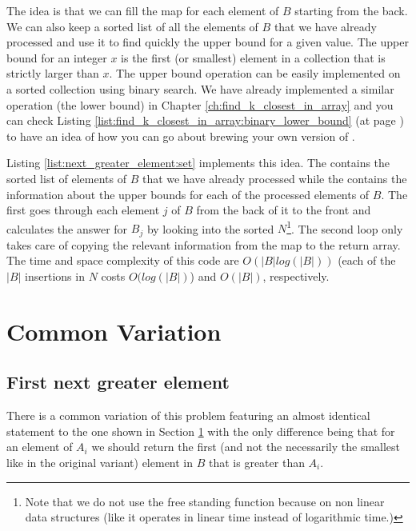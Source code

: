 The idea is that we can fill the map for each element of $B$ starting from the back. We can also
keep a sorted list of all the elements of $B$ that we have already processed and use it to find
quickly the upper bound for a given value. The upper bound for an integer $x$ is the first (or
smallest) element in a collection that is strictly larger than $x$. The upper bound operation can be
easily implemented on a sorted collection using binary search. We have already implemented a similar operation (the lower bound)
in Chapter \ref{ch:find_k_closest_in_array} and you can check Listing \ref{list:find_k_closest_in_array:binary_lower_bound} (at page \pageref{list:find_k_closest_in_array:binary_lower_bound})
to have an idea of how you can go about brewing  your own version of .


Listing \ref{list:next_greater_element:set} implements this idea. The  contains the sorted list of
elements of $B$ that we have already processed while the 
contains the information about the upper bounds for each of the processed elements of $B$. The first
 goes through each element $j$ of $B$ from the back of it to the front and calculates
the answer for $B_j$ by looking into the sorted  $N$\footnote{Note that we do not
use the free standing function \href{https://en.cppreference.com/w/cpp/algorithm/upper_bound}{} because on non linear data structures (like
 it operates in linear time instead of logarithmic time.)}.
The second  loop only takes care of copying the relevant information from the map  to the return array.
The time and space complexity of this code are $O(|B|log(|B|))$ (each of the $|B|$ insertions in $N$ costs $O(log(|B|)$) and $O(|B|)$, respectively.



\section{Common Variation}
\subsection{First next greater element}
\label{next_greater_element:sec:first}
There is a common variation of this problem featuring an almost identical statement to the one shown in Section \ref{}
with the only difference being that for an element of $A_i$ we should return the first (and not the necessarily the smallest like in the original variant)
element in $B$ that is greater than $A_i$.

